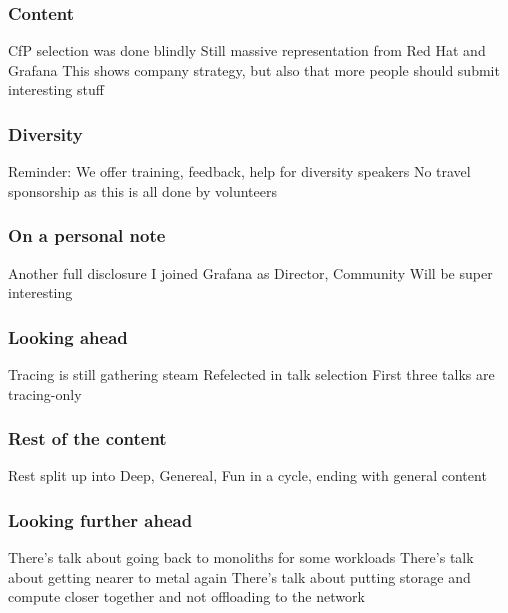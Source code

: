 \documentclass[aspectratio=169]{beamer}
\begin{document}
\begin{frame}
	\frametitle{Content}
	\begin{center}
		\vfill
		CfP selection was done blindly
		\vfill
		Still massive representation from Red Hat and Grafana
		\vfill
		This shows company strategy, but also that more people should submit interesting stuff
		\vfill
	\end{center}
\end{frame}

\begin{frame}
	\frametitle{Diversity}
	\begin{center}
		\vfill
		Reminder: We offer training, feedback, help for diversity speakers
		\vfill
		No travel sponsorship as this is all done by volunteers
		\vfill
	\end{center}
\end{frame}

\begin{frame}
	\frametitle{On a personal note}
	\begin{center}
		\vfill
		Another full disclosure
		\vfill
		I joined Grafana as Director, Community
		\vfill
		Will be super interesting
		\vfill
	\end{center}
\end{frame}

\begin{frame}
	\frametitle{Looking ahead}
	\begin{center}
		\vfill
		Tracing is still gathering steam
		\vfill
		Refelected in talk selection
		\vfill
		First three talks are tracing-only
		\vfill
	\end{center}
\end{frame}

\begin{frame}
	\frametitle{Rest of the content}
	\begin{center}
		\vfill
		Rest split up into Deep, Genereal, Fun in a cycle, ending with general content
		\vfill
	\end{center}
\end{frame}

\begin{frame}
	\frametitle{Looking further ahead}
	\begin{center}
		\vfill
		There's talk about going back to monoliths for some workloads
		\vfill
		There's talk about getting nearer to metal again
		\vfill
		There's talk about putting storage and compute closer together and not offloading to the network
		\vfill
	\end{center}
\end{frame}
\end{document}
